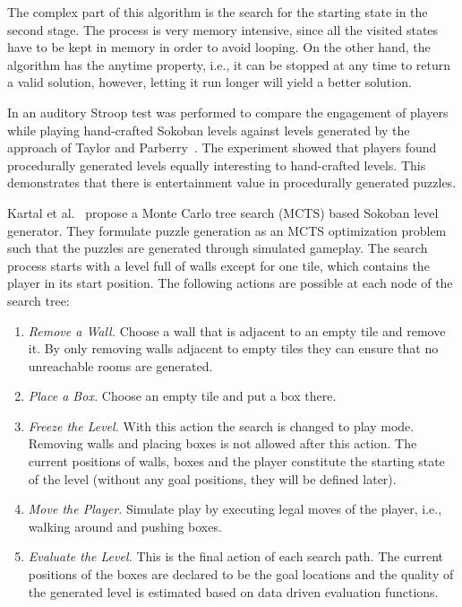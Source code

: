 \documentclass[runningheads]{llncs}
\begin{document}
The complex part of this algorithm is the search for the starting state in the second stage.
The process is very memory intensive, since all the visited states have to be kept in
memory in order to avoid looping. On the other hand, the algorithm has the anytime property, i.e., it
can be stopped at any time to return a valid solution, however, letting it run longer will yield
a better solution.

In \cite{taylor2015attention} an auditory Stroop test was performed to compare the engagement of
players while playing hand-crafted Sokoban levels against levels generated by the approach of
Taylor and Parberry~\cite{taylor2011procedural}. The experiment showed that players found
procedurally generated levels equally interesting to hand-crafted levels. This demonstrates
that there is entertainment value in procedurally generated puzzles.

Kartal et al.~\cite{kartal2016data} propose a Monte Carlo tree search (MCTS) based Sokoban level
generator. They formulate puzzle generation as an MCTS optimization problem such that the puzzles
are generated through simulated gameplay. The search process starts with a level full of walls except
for one tile, which contains the player in its start position. The following actions are possible at each
node of the search tree:
\begin{enumerate}
\item \emph{Remove a Wall.} Choose a wall that is adjacent to an empty tile and remove it. By only removing walls
adjacent to empty tiles they can ensure that no unreachable rooms are generated.
\item \emph{Place a Box.} Choose an empty tile and put a box there.
\item \emph{Freeze the Level.} With this action the search is changed to play mode. Removing walls and placing
boxes is not allowed after this action. The current positions of walls, boxes and the player constitute
the starting state of the level (without any goal positions, they will be defined later).
\item \emph{Move the Player.} Simulate play by executing legal moves of the player, i.e., walking
around and pushing boxes.
\item \emph{Evaluate the Level.} This is the final action of each search path. The current positions of the boxes
are declared to be the goal locations and the quality of the generated level is estimated based on data driven
evaluation functions.
\end{enumerate}
\end{document}
